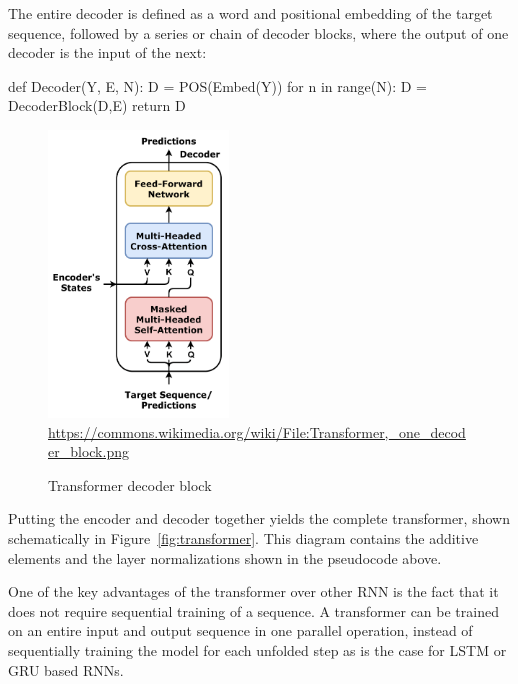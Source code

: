 The entire decoder is defined as a word and positional embedding of the target sequence, followed by a series or chain of decoder blocks, where the output of one decoder is the input of the next:

\begin{textcode}
def Decoder(Y, E, N):
  D = POS(Embed(Y))
  for n in range(N):
    D = DecoderBlock(D,E)
  return D
\end{textcode}

\begin{figure}
\begin{center}
\includegraphics[height=3in]{Transformer,_one_decoder_block.png} \\

\scriptsize \url{https://commons.wikimedia.org/wiki/File:Transformer,_one_decoder_block.png}\normalsize
\end{center}
\caption{Transformer decoder block}
\label{fig:transformerdecoder}
\end{figure}

Putting the encoder and decoder together yields the complete transformer, shown schematically in Figure~\ref{fig:transformer}. This diagram contains the additive elements and the layer normalizations shown in the pseudocode above. 

One of the key advantages of the transformer over other RNN is the fact that it does not require sequential training of a sequence. A transformer can be trained on an entire input and output sequence in one parallel operation, instead of sequentially training the model for each unfolded step as is the case for LSTM or GRU based RNNs.

